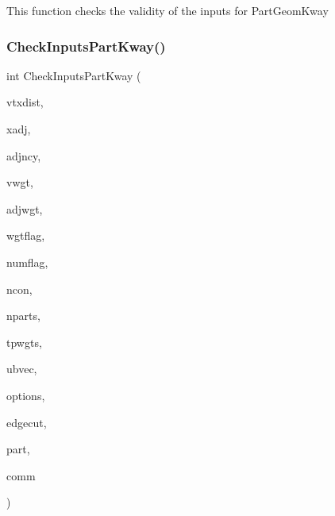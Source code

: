 This function checks the validity of the inputs for Part\+Geom\+Kway \mbox{\label{a00951_a3114953d144faa3310e9878c56b3f631}} 
\subsubsection{\texorpdfstring{Check\+Inputs\+Part\+Kway()}{CheckInputsPartKway()}}
{\footnotesize\ttfamily int Check\+Inputs\+Part\+Kway (\begin{DoxyParamCaption}\item[{\hyperlink{a00876_aaa5262be3e700770163401acb0150f52}{idx\+\_\+t} $\ast$}]{vtxdist,  }\item[{\hyperlink{a00876_aaa5262be3e700770163401acb0150f52}{idx\+\_\+t} $\ast$}]{xadj,  }\item[{\hyperlink{a00876_aaa5262be3e700770163401acb0150f52}{idx\+\_\+t} $\ast$}]{adjncy,  }\item[{\hyperlink{a00876_aaa5262be3e700770163401acb0150f52}{idx\+\_\+t} $\ast$}]{vwgt,  }\item[{\hyperlink{a00876_aaa5262be3e700770163401acb0150f52}{idx\+\_\+t} $\ast$}]{adjwgt,  }\item[{\hyperlink{a00876_aaa5262be3e700770163401acb0150f52}{idx\+\_\+t} $\ast$}]{wgtflag,  }\item[{\hyperlink{a00876_aaa5262be3e700770163401acb0150f52}{idx\+\_\+t} $\ast$}]{numflag,  }\item[{\hyperlink{a00876_aaa5262be3e700770163401acb0150f52}{idx\+\_\+t} $\ast$}]{ncon,  }\item[{\hyperlink{a00876_aaa5262be3e700770163401acb0150f52}{idx\+\_\+t} $\ast$}]{nparts,  }\item[{\hyperlink{a00876_a1924a4f6907cc3833213aba1f07fcbe9}{real\+\_\+t} $\ast$}]{tpwgts,  }\item[{\hyperlink{a00876_a1924a4f6907cc3833213aba1f07fcbe9}{real\+\_\+t} $\ast$}]{ubvec,  }\item[{\hyperlink{a00876_aaa5262be3e700770163401acb0150f52}{idx\+\_\+t} $\ast$}]{options,  }\item[{\hyperlink{a00876_aaa5262be3e700770163401acb0150f52}{idx\+\_\+t} $\ast$}]{edgecut,  }\item[{\hyperlink{a00876_aaa5262be3e700770163401acb0150f52}{idx\+\_\+t} $\ast$}]{part,  }\item[{M\+P\+I\+\_\+\+Comm $\ast$}]{comm }\end{DoxyParamCaption})}

